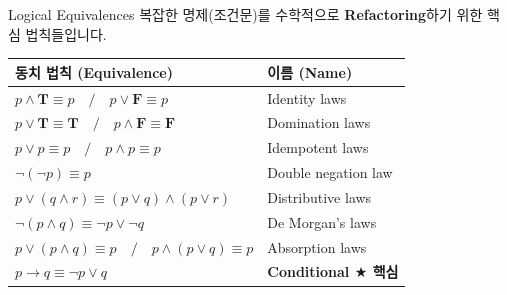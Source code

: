 \documentclass[10.5pt,compress]{beamer}
\begin{document}
\begin{frame}[t]{Logical Equivalences}
    \footnotesize
    복잡한 명제(조건문)를 수학적으로 \textbf{Refactoring}하기 위한 핵심 법칙들입니다.
    \vspace{0.08cm}

    \begin{center}
    \renewcommand{\arraystretch}{1.65}
    \small
    \begin{tabular}{ll}
        \toprule
        \textbf{동치 법칙 (Equivalence)} & \textbf{이름 (Name)} \\
        \midrule
        $p \land \mathbf{T} \equiv p \quad / \quad p \lor \mathbf{F} \equiv p$ & Identity laws \\
        $p \lor \mathbf{T} \equiv \mathbf{T} \quad / \quad p \land \mathbf{F} \equiv \mathbf{F}$ & Domination laws \\
        $p \lor p \equiv p \quad / \quad p \land p \equiv p$ & Idempotent laws \\
        $\neg(\neg p) \equiv p$ & Double negation law \\
        $p \lor (q \land r) \equiv (p \lor q) \land (p \lor r)$ & Distributive laws \\
        $\neg(p \land q) \equiv \neg p \lor \neg q$ & De Morgan's laws \\
        $p \lor (p \land q) \equiv p \quad / \quad p \land (p \lor q) \equiv p$ & Absorption laws \\
        \midrule
        \rowcolor{lightblue}
        $p \rightarrow q \equiv \neg p \lor q$ & \textbf{Conditional $\bigstar$ 핵심} \\
        \bottomrule
    \end{tabular}
    \renewcommand{\arraystretch}{1}
    \end{center}
\end{frame}
\end{document}
